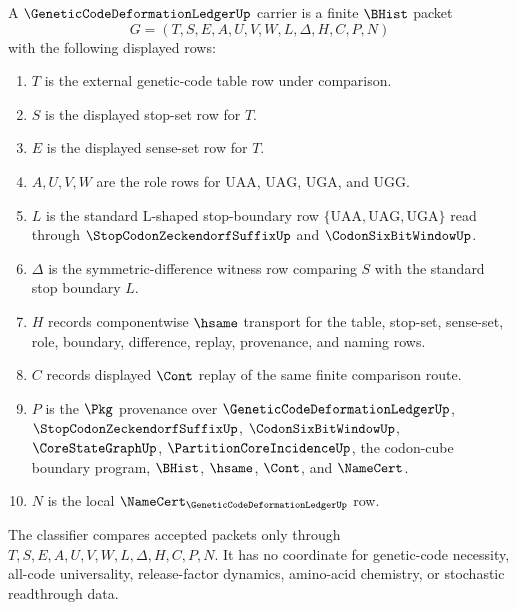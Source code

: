 \begin{definition}
\label{def:genetic-code-deformation-ledger-carrier}
A $\GeneticCodeDeformationLedgerUp$ carrier is a finite $\BHist$ packet
$$
G=(T,S,E,A,U,V,W,L,\Delta,H,C,P,N)
$$
with the following displayed rows:
\begin{enumerate}
\item $T$ is the external genetic-code table row under comparison.
\item $S$ is the displayed stop-set row for $T$.
\item $E$ is the displayed sense-set row for $T$.
\item $A,U,V,W$ are the role rows for $\mathrm{UAA}$, $\mathrm{UAG}$, $\mathrm{UGA}$, and $\mathrm{UGG}$.
\item $L$ is the standard L-shaped stop-boundary row $\{\mathrm{UAA},\mathrm{UAG},\mathrm{UGA}\}$ read through $\StopCodonZeckendorfSuffixUp$ and $\CodonSixBitWindowUp$.
\item $\Delta$ is the symmetric-difference witness row comparing $S$ with the standard stop boundary $L$.
\item $H$ records componentwise $\hsame$ transport for the table, stop-set, sense-set, role, boundary, difference, replay, provenance, and naming rows.
\item $C$ records displayed $\Cont$ replay of the same finite comparison route.
\item $P$ is the $\Pkg$ provenance over $\GeneticCodeDeformationLedgerUp$, $\StopCodonZeckendorfSuffixUp$, $\CodonSixBitWindowUp$, $\CoreStateGraphUp$, $\PartitionCoreIncidenceUp$, the codon-cube boundary program, $\BHist$, $\hsame$, $\Cont$, and $\NameCert$.
\item $N$ is the local $\NameCert_{\GeneticCodeDeformationLedgerUp}$ row.
\end{enumerate}
The classifier compares accepted packets only through $T,S,E,A,U,V,W,L,\Delta,H,C,P,N$. It has no coordinate for genetic-code necessity, all-code universality, release-factor dynamics, amino-acid chemistry, or stochastic readthrough data.
\end{definition}

